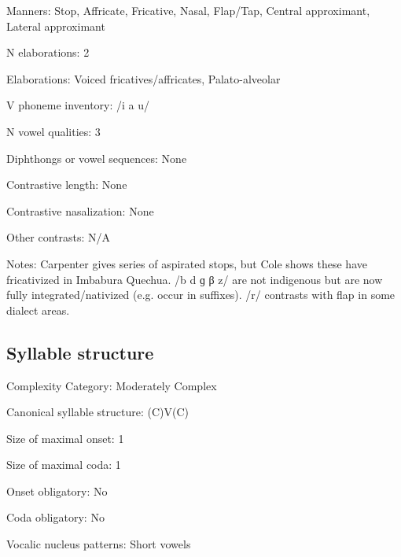 {\begin{appendixdesc}
\item[Manners:] Stop, Affricate, Fricative, Nasal, Flap/Tap, Central approximant, Lateral approximant

\item[N elaborations:] 2

\item[Elaborations:] Voiced fricatives/affricates, Palato-alveolar

\item[V phoneme inventory:] /i a u/

\item[N vowel qualities:] 3

\item[Diphthongs or vowel sequences:] None

\item[Contrastive length:] None

\item[Contrastive nasalization:] None

\item[Other contrasts:] N/A

\item[Notes:] Carpenter gives series of aspirated stops, but Cole shows these have fricativized in Imbabura Quechua. /b d ɡ β z/ are not indigenous but are now fully integrated/nativized (e.g. occur in suffixes). /r/ contrasts with flap in some dialect areas.
\end{appendixdesc}
\subsection*{Syllable structure}
\begin{appendixdesc}

\item[Complexity Category:] Moderately Complex

\item[Canonical syllable structure:] (C)V(C) \citep[203--205]{Cole1982}

\item[Size of maximal onset:] 1

\item[Size of maximal coda:] 1

\item[Onset obligatory:] No

\item[Coda obligatory:] No

\item[Vocalic nucleus patterns:] Short vowels


\end{appendixdesc}}
